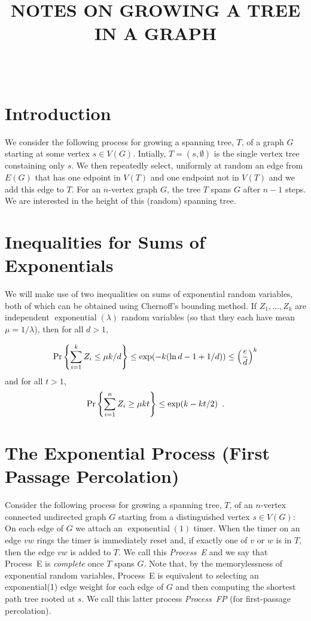 \documentclass[lotsofwhite]{patmorin}
\title{\MakeUppercase{Notes on Growing a Tree in a Graph}}
\author{\ }
\DeclareMathOperator{\exponential}{exponential}
\begin{document}
\maketitle
\section{Introduction}

We consider the following process for growing a spanning tree,
$T$, of a graph $G$ starting at some vertex $s\in V(G)$.  Intially,
$T=(s,\emptyset)$ is the single vertex tree constaining only $s$. We then
repeatedly select, uniformly at random an edge from $E(G)$ that has one
edpoint in $V(T)$ and one endpoint not in $V(T)$ and we add this edge
to $T$.  For an $n$-vertex graph $G$, the tree $T$ spans $G$ after $n-1$
steps.  We are interested in the height of this (random) spanning tree.

\section{Inequalities for Sums of Exponentials}

We will make use of two inequalities on sums of exponential random
variables, both of which can be obtained using Chernoff's bounding
method.  If $Z_1,\ldots,Z_k$ are independent $\exponential(\lambda)$
random variables (so that they each have mean $\mu=1/\lambda$), then
for all $d>1$,

\begin{equation}
    \Pr\left\{\sum_{i=1}^k Z_i \le \mu k/d\right\} \le \exp(-k(\ln d -1 + 1/d)) \le \left(\frac{e}{d}\right)^k  \eqlabel{head-bound}
\end{equation}
and for all $t>1$, 
\begin{equation}
    \Pr\left\{\sum_{i=1}^n Z_i \ge \mu k t\right\} \le \exp (k-kt/2) \enspace . \eqlabel{tail-bound}
\end{equation}



\section{The Exponential Process (First Passage Percolation)}

Consider the following process for growing a spanning tree, $T$, of an
$n$-vertex connected undirected graph $G$ starting from a distinguished
vertex $s\in V(G)$:  On each edge of $G$ we attach an $\exponential(1)$
timer.  When the timer on an edge $vw$ rings the timer is immediately
reset and, if exactly one of $v$ or $w$ is in $T$, then the edge $vw$
is added to $T$.  We call this \emph{Process~E} and we say that Process~E
is \emph{complete} once $T$ spans $G$.  Note that, by the memorylessness
of exponential random variables, Process~E is equivalent to selecting
an exponential(1) edge weight for each edge of $G$ and then computing
the shortest path tree rooted at $s$.  We call this latter process
\emph{Process~FP} (for first-passage percolation).
\end{document}

